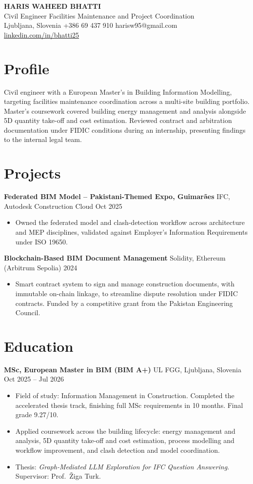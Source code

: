 \documentclass[a4paper,10.5pt]{article}
\newcommand{\datefill}{\dotfill}
\newcommand{\entry}[3]{\vspace{2.5pt}\noindent\textbf{#1} \textbar{} #2 \datefill{} #3\par\vspace{0.5pt}}
\newcommand{\ROLELINE}{Civil Engineer \textbar{} Facilities Maintenance and Project Coordination}
\newcommand{\projGuimaraes}{%
\entry{Federated BIM Model -- Pakistani-Themed Expo, Guimar\~aes}{IFC, Autodesk Construction Cloud}{Oct 2025}
\begin{itemize}
  \item Owned the federated model and clash-detection workflow across architecture
        and MEP disciplines, validated against Employer's Information Requirements
        under ISO 19650.
\end{itemize}}
\newcommand{\projBlockchain}{%
\entry{Blockchain-Based BIM Document Management}{Solidity, Ethereum (Arbitrum Sepolia)}{2024}
\begin{itemize}
  \item Smart contract system to sign and manage construction documents, with
        immutable on-chain linkage, to streamline dispute resolution under FIDIC
        contracts. Funded by a competitive grant from the
        Pakistan Engineering Council.
\end{itemize}}
\begin{document}
\begin{center}
  {\LARGE\bfseries HARIS WAHEED BHATTI}\\[2pt]
  {\large \ROLELINE}\\[3pt]
  Ljubljana, Slovenia \textbar{} +386 69 437 910 \textbar{} harisw95@gmail.com\\
  \href{https://linkedin.com/in/bhatti25}{linkedin.com/in/bhatti25}
\end{center}
\vspace{-4pt}

\section{Profile}

\noindent Civil engineer with a European Master's in Building Information Modelling,
targeting facilities maintenance coordination across a multi-site building portfolio.
Master's coursework covered building energy management and analysis alongside 5D
quantity take-off and cost estimation. Reviewed contract and arbitration
documentation under FIDIC conditions during an internship, presenting findings to the
internal legal team.

\section{Projects}

 \projGuimaraes \projBlockchain

\section{Education}
\entry{MSc, European Master in BIM (BIM A+)}{UL FGG, Ljubljana, Slovenia}{Oct 2025 -- Jul 2026}
\begin{itemize}
  \item Field of study: Information Management in Construction. Completed the
        accelerated thesis track, finishing full MSc requirements in 10 months.
        Final grade 9.27/10.
  \item Applied coursework across the building lifecycle: energy management and
        analysis, 5D quantity take-off and cost estimation, process modelling and
        workflow improvement, and clash detection and model coordination.
  \item Thesis: \textit{Graph-Mediated LLM Exploration for IFC Question Answering}.
        Supervisor: Prof.~\v{Z}iga Turk.
\end{itemize}
\end{document}
